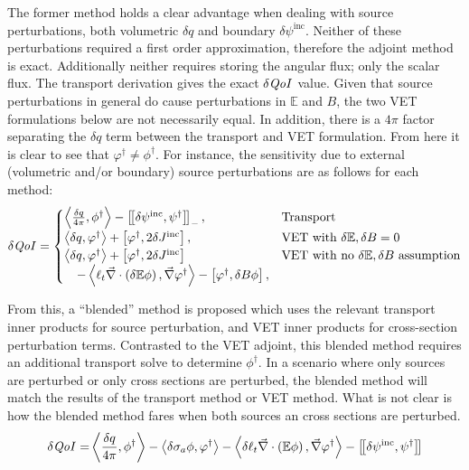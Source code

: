 \documentclass[12pt]{report}
\newcommand{\bra}{\left\langle}
\newcommand{\ket}{\right\rangle}
\newcommand{\sbraSN}{\left[ \! \left[}
\newcommand{\sketSN}{\right] \! \right]}
\newcommand{\sbra}{\left[}
\newcommand{\sket}{\right]}
\renewcommand{\div}{\vec{\nabla} \cdot}
\newcommand{\grad}{\vec{\nabla}}
\newcommand{\vefadj}{\varphi^\dag}
\newcommand{\Edd}{\mathbb{E}}
\newcommand{\BEdd}{B}
\newcommand{\siga}{\sigma_a}
\newcommand{\isigt}{\ell_t}
\newcommand{\angSourced}{\frac{\delta q}{4 \pi}}
\newcommand{\scalSource}{q}
\newcommand{\qoi}{{\it QoI}\xspace}
\begin{document}
The former method holds a clear advantage when dealing with source perturbations, both volumetric $\delta q$ and boundary $\delta \psi^\text{inc}$. Neither of these perturbations required a first order approximation, therefore the adjoint method is exact. Additionally neither requires storing the angular flux; only the scalar flux. The transport derivation gives the exact $\delta \qoi$ value. Given that source perturbations in general do cause perturbations in $\Edd$ and $\BEdd$, the two VET formulations below are not necessarily equal. In addition, there is a $4 \pi$ factor separating the $\delta q$ term between the transport and VET formulation. From here it is clear to see that $\varphi^\dag \neq \phi^\dag$.
For instance, the sensitivity due to external (volumetric and/or boundary) source perturbations are as follows for each method:
\begin{equation}
\label{sourceDeltaQoI}
\delta \qoi = 
\begin{cases}
\bra \angSourced   , \phi^\dag  \ket - \sbraSN \delta \psi^{\text{inc}}, \psi^\dag \sketSN_- , & \text{Transport}  \\
\bra \delta \scalSource , \vefadj \ket + \sbra \vefadj, 2 \delta J^{\text{inc}} \sket, & \text{VET with $\delta \Edd, \delta B=0$} \\
\bra \delta \scalSource , \vefadj \ket + \sbra \vefadj, 2 \delta J^{\text{inc}} \sket  & \text{VET with no $\delta \Edd,\delta B$ assumption} \\
\quad - \bra  \isigt \div \left( \delta \Edd \phi \right), \grad \vefadj \ket - \sbra \vefadj, \delta \BEdd \phi \sket,  \\
\end{cases} 
\end{equation}

From this, a ``blended'' method is proposed which uses the relevant transport inner products for source perturbation, and VET inner products for cross-section perturbation terms. Contrasted to the VET adjoint, this blended method requires an additional transport solve to determine $\phi^\dag$. In a scenario where only sources are perturbed or only cross sections are perturbed, the blended method will match the results of the transport method or VET method. What is not clear is how the blended method fares when both sources an cross sections are perturbed.
\begin{equation}
\label{Blendsens}
\begin{split}
\delta \qoi =&  \bra \angSourced , \phi^\dag \ket - \bra \delta \siga \phi, \vefadj \ket - \bra \delta \isigt \div \left( \Edd \phi \right) , \grad \vefadj \ket
- \sbraSN \delta \psi^\text{inc}, \psi^\dag \sketSN \\
\end{split}
\end{equation}
\end{document}
